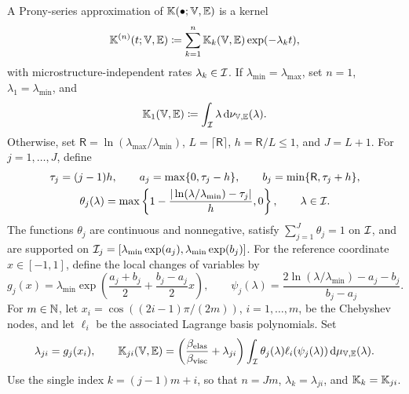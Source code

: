 {\begin{definition}\label{def:prony_series_approximation}
A Prony-series approximation of $\mathbb{K}(\bullet;\mathbb{V},\mathbb{E})$ is a kernel
\begin{equation}\label{eq:Kn_def}
\mathbb{K}^{(n)}(t;\mathbb{V},\mathbb{E})\coloneqq\sum_{k=1}^n\mathbb{K}_k(\mathbb{V},\mathbb{E})\exp(-\lambda_k t),
\end{equation}
with microstructure-independent rates $\lambda_k\in{\mathcal{I}}$. If $\lambda_{\min}=\lambda_{\max}$, set $n=1$, $\lambda_1=\lambda_{\min}$, and
\begin{equation}\label{eq:Ki_def_degenerate}
\mathbb{K}_1(\mathbb{V},\mathbb{E})\coloneqq\int_{{\mathcal{I}}}\lambda\,\mathrm d\nu_{\mathbb{V},\mathbb{E}}(\lambda).
\end{equation}
Otherwise, set $\mathsf R=\ln(\lambda_{\max}/\lambda_{\min})$, $L=\lceil\mathsf R\rceil$, $h=\mathsf R/L\le1$, and $J=L+1$. For $j=1,\dots,J$, define
\begin{gather*}
\tau_j=(j-1)h,\qquad a_j=\max\{0,\tau_j-h\},\qquad b_j=\min\{\mathsf R,\tau_j+h\},\\
\theta_j(\lambda)=\max\left\{1-\frac{|\ln(\lambda/\lambda_{\min})-\tau_j|}{h},0\right\},\qquad\lambda\in{\mathcal{I}}.
\end{gather*}
The functions $\theta_j$ are continuous and nonnegative, satisfy $\sum_{j=1}^J\theta_j=1$ on ${\mathcal{I}}$, and are supported on ${\mathcal{I}}_j=[\lambda_{\min}\exp(a_j),\lambda_{\min}\exp(b_j)]$. For the reference coordinate $x\in[-1,1]$, define the local changes of variables by
\begin{equation}\label{eq:log_spectral_coordinate}
g_j(x)=\lambda_{\min}\exp\left(\frac{a_j+b_j}{2}+\frac{b_j-a_j}{2}x\right),\qquad
\psi_j(\lambda)=\frac{2\ln(\lambda/\lambda_{\min})-a_j-b_j}{b_j-a_j}.
\end{equation}
For $m\in\mathbb{N}$, let $x_i=\cos((2i-1)\pi/(2m))$, $i=1,\dots,m$, be the Chebyshev nodes, and let $\ell_i$ be the associated Lagrange basis polynomials. Set
\begin{equation}\label{eq:Ki_def}
\lambda_{ji}=g_j(x_i),\qquad
\mathbb{K}_{ji}(\mathbb{V},\mathbb{E})=\left(\frac{\beta_{\rm elas}}{\beta_{\rm visc}}+\lambda_{ji}\right)\int_{{\mathcal{I}}}\theta_j(\lambda)\ell_i(\psi_j(\lambda))\,\mathrm d\mu_{\mathbb{V},\mathbb{E}}(\lambda).
\end{equation}
Use the single index $k=(j-1)m+i$, so that $n=Jm$, $\lambda_k=\lambda_{ji}$, and $\mathbb{K}_k=\mathbb{K}_{ji}$.
\end{definition}

}
